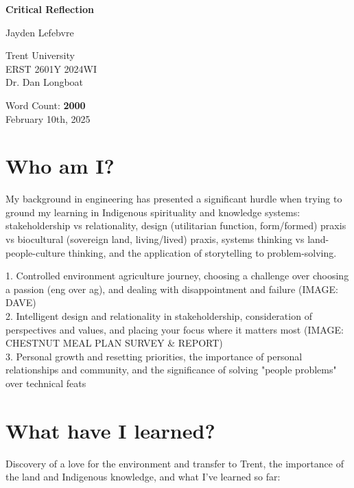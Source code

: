 \documentclass{report}
\begin{document}
\begin{titlepage}
    \begin{center}
        \vspace*{1.2cm}

        \textbf{Critical Reflection}

        \vspace{1.25cm}

        Jayden Lefebvre\\

        \vspace{5cm}
        
        Trent University\\
        ERST 2601Y 2024WI\\
        Dr. Dan Longboat\\

        \vfill

        Word Count: \textbf{2000}\\
        February 10th, 2025
        
    \end{center}
\end{titlepage}

\clearpage

\section{Who am I?}

My background in engineering has presented a significant hurdle when trying to ground my learning in Indigenous spirituality and knowledge systems: stakeholdership vs relationality, design (utilitarian function, form/formed) praxis vs biocultural (sovereign land, living/lived) praxis, systems thinking vs land-people-culture thinking, and the application of storytelling to problem-solving.

1. Controlled environment agriculture journey, choosing a challenge over choosing a passion (eng over ag), and dealing with disappointment and failure (IMAGE: DAVE)\\
2. Intelligent design and relationality in stakeholdership, consideration of perspectives and values, and placing your focus where it matters most (IMAGE: CHESTNUT MEAL PLAN SURVEY \& REPORT)\\
3. Personal growth and resetting priorities, the importance of personal relationships and community, and the significance of solving "people problems" over technical feats

\section{What have I learned?}
Discovery of a love for the environment and transfer to Trent, the importance of the land and Indigenous knowledge, and what I've learned so far:
\end{document}
